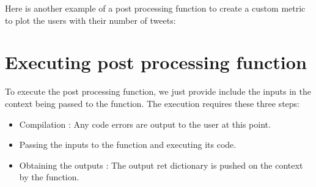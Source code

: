 \documentclass[letterpaper,10pt,english]{sphinxmanual}
\begin{document}
Here is another example of a post processing function to create a custom metric to plot the users with their number of tweets:

\begin{sphinxVerbatim}[commandchars=\\\{\}]
 
      \PYG{p}{[}\PYG{p}{]} \PYG{p}{[}\PYG{p}{]}
     \PYG{p}{[}\PYG{p}{]} 
      \PYG{p}{[}\PYG{p}{]}
      \PYG{p}{[}\PYG{p}{]}
       
        \PYG{p}{[}\PYG{p}{]}\PYG{p}{[}\PYG{p}{]}
        \PYG{p}{[}\PYG{p}{]}\PYG{p}{[}\PYG{p}{]}

      
    \PYG{p}{[}\PYG{p}{]}  
    \PYG{p}{[}\PYG{p}{]}  
     
\end{sphinxVerbatim}


\section{Executing post processing function}
\label{\detokenize{postprocessing:executing-post-processing-function}}
To execute the post processing function, we just provide include the inputs in the context being passed to the function. The execution requires these three steps:
\begin{itemize}
\item {} 
Compilation : Any code errors are output to the user at this point.

\item {} 
Passing the inputs to the function and executing its code.

\item {} 
Obtaining the outputs : The output ret dictionary is pushed on the context by the function.

\end{itemize}
\end{document}
